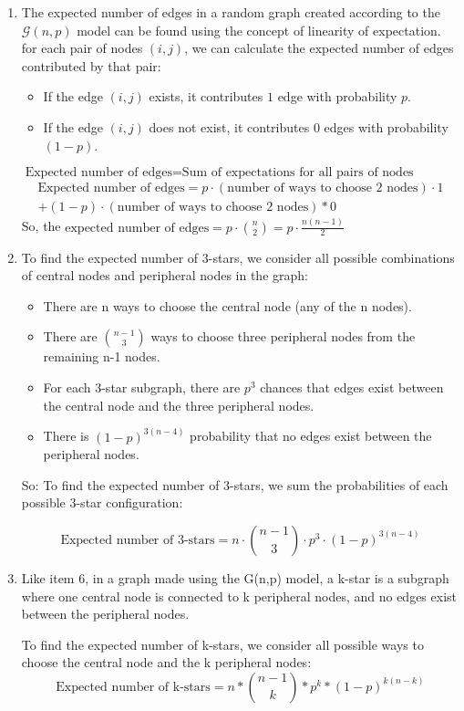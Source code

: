 \begin{enumerate}
	\item The expected number of edges in a random graph created according to the $\mathcal{G}(n,p)$ model can be found using the concept of linearity of expectation.
	for each pair of nodes $ (i, j) $, we can calculate the expected number of edges contributed by that pair:
	\begin{itemize}
	\item If the edge $ (i, j) $ exists, it contributes $ 1 $ edge with probability $ p $.
	\item If the edge $ (i, j) $ does not exist, it contributes $ 0 $ edges with probability $ (1 - p) $.
	\end{itemize}
	
	$ \text{Expected number of edges} = \text{Sum of expectations for all pairs of nodes} $
	\begin{multline*}
	\text{Expected number of edges} = p \cdot (\text{number of ways to choose 2 nodes}) \cdot 1 \\
	+ (1 - p) \cdot (\text{number of ways to choose 2 nodes}) * 0
	\end{multline*}
	So, the $ \text{expected number of edges} = p \cdot {n \choose 2}  = p \cdot \frac{n(n-1)}{2}$
	\item To find the expected number of 3-stars, we consider all possible combinations of central nodes and peripheral nodes in the graph:
\begin{itemize}
	\item 	There are n ways to choose the central node (any of the n nodes).
	\item 	There are $\binom{n-1}{3}$ ways to choose three peripheral nodes from the remaining n-1 nodes.
	\item 	For each 3-star subgraph, there are $p^3$ chances that edges exist between the central node and the three peripheral nodes.
	\item 	There is $(1-p)^{3(n-4)}$ probability that no edges exist between the peripheral nodes.
\end{itemize}
	
	So: To find the expected number of 3-stars, we sum the probabilities of each possible 3-star configuration:
	
	\[
	\text{Expected number of 3-stars} = n \cdot \binom{n-1}{3} \cdot p^3 \cdot (1-p)^{3(n-4)}
	\]
	\item Like item 6, in a graph made using the G(n,p) model, a k-star is a subgraph where one central node is connected to k peripheral nodes, and no edges exist between the peripheral nodes.
	
	To find the expected number of k-stars, we consider all possible ways to choose the central node and the k peripheral nodes:
	\[
	\text{Expected number of k-stars} = n * \binom{n-1}{k} * p^k * (1-p)^{k(n-k)}
	\]
\end{enumerate}


